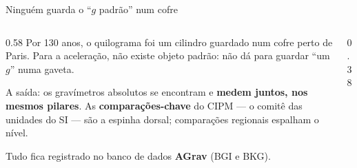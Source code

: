 \documentclass[aspectratio=169,11pt]{beamer}
\newcommand{\bnum}[1]{\textbf{\textcolor{mTeal}{#1}}}
\begin{document}
\begin{frame}{Ninguém guarda o ``$g$ padrão'' num cofre}
  \begin{columns}[T]
    \begin{column}{0.58\textwidth}
      Por 130 anos, o quilograma foi um cilindro guardado num cofre perto de Paris.
      Para a aceleração, \alert{não existe objeto padrão}: não dá para guardar ``um $g$''
      numa gaveta.
      \medskip

      A saída: os gravímetros absolutos se encontram e \bnum{medem juntos, nos mesmos
      pilares}. As \textbf{comparações-chave} do CIPM --- o comitê das unidades do SI --- são
      a espinha dorsal; comparações regionais espalham o nível.
      \medskip

      Tudo fica registrado no banco de dados \bnum{AGrav} (BGI e BKG).
    \end{column}
    \begin{column}{0.38\textwidth}
      \centering
    \end{column}
  \end{columns}
\end{frame}
\end{document}
